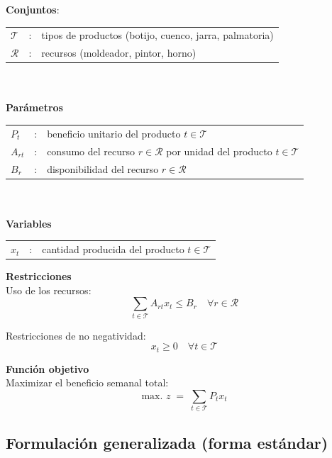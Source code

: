 \textbf{Conjuntos}:

\begin{tabular}{l c l}
    $\mathcal{T}$  & : & tipos de productos (botijo, cuenco, jarra, palmatoria) \\
    $\mathcal{R}$  & : & recursos (moldeador, pintor, horno)
\end{tabular}
\\
\\

\textbf{Parámetros}

\begin{tabular}{l c l}
    $P_t$       & : & beneficio unitario del producto $t \in \mathcal{T}$ \\
    $A_{rt}$    & : & consumo del recurso $r \in \mathcal{R}$ por unidad del producto $t \in \mathcal{T}$ \\
    $B_r$       & : & disponibilidad del recurso $r \in \mathcal{R}$ \\
\end{tabular}
\\
\\

\textbf{Variables}\mbox{}

\begin{tabular}{l c l}
    $x_t$  & : & cantidad producida del producto $t \in \mathcal{T}$ \\
\end{tabular}

\textbf{Restricciones}\mbox{}\\

Uso de los recursos:
\begin{equation}
    \sum_{t \in \mathcal{T}} A_{rt} x_t \leq B_r \quad \forall r \in \mathcal{R}
\end{equation}

Restricciones de no negatividad:
\begin{equation}
    x_t \geq 0 \quad \forall t \in \mathcal{T}
\end{equation}

\textbf{Función objetivo}\mbox{}\\

Maximizar el beneficio semanal total:
\begin{equation}
    \mbox{max. } z \;=\; \sum_{t \in \mathcal{T}} P_t x_t
\end{equation}

\subsection{Formulación generalizada (forma estándar)}


